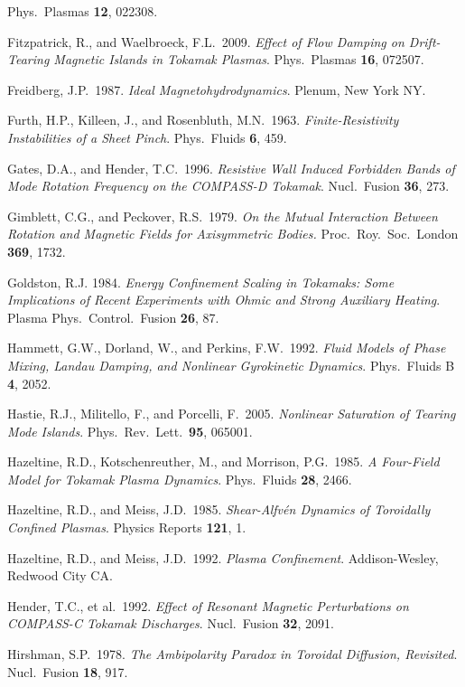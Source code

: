 \documentclass[notitlepage,12pt]{article}
\begin{document}
\begin{description}
Phys.\ Plasmas {\bf 12}, 022308. 
\item Fitzpatrick, R., and Waelbroeck, F.L.\ 2009. {\em Effect of Flow Damping on Drift-Tearing Magnetic Islands in Tokamak Plasmas}.
Phys.\ Plasmas {\bf 16}, 072507.
\item Freidberg, J.P.\ 1987. {\em Ideal Magnetohydrodynamics}. Plenum, New York NY. 
\item Furth, H.P., Killeen, J., and Rosenbluth, M.N.\ 1963. {\em Finite-Resistivity Instabilities of a Sheet Pinch}. Phys.\ Fluids {\bf 6}, 459.
\item Gates, D.A., and Hender, T.C.\ 1996. {\em Resistive Wall Induced Forbidden Bands of Mode Rotation Frequency on the COMPASS-D Tokamak}. Nucl.\ Fusion {\bf 36}, 273. 
\item Gimblett, C.G., and Peckover, R.S.\ 1979. {\em On the Mutual Interaction Between Rotation and Magnetic Fields
for Axisymmetric Bodies.} Proc.\ Roy.\ Soc.\ London {\bf 369}, 1732. 
\item Goldston, R.J. 1984. {\em Energy Confinement Scaling in Tokamaks: Some Implications of Recent Experiments with Ohmic and Strong Auxiliary Heating}. Plasma Phys.\ Control.\ Fusion {\bf 26}, 87. 
\item Hammett, G.W., Dorland, W., and Perkins, F.W.\ 1992.  {\em Fluid Models of Phase Mixing, Landau Damping, and Nonlinear Gyrokinetic Dynamics}. Phys.\ Fluids B {\bf 4}, 2052. 
\item Hastie, R.J., Militello, F., and Porcelli, F.\ 2005. {\em Nonlinear Saturation of Tearing Mode Islands}. Phys.\ Rev.\ Lett.\ {\bf 95}, 065001. 
\item Hazeltine, R.D., Kotschenreuther, M., and Morrison, P.G.\ 1985. {\em A Four-Field Model for Tokamak Plasma Dynamics}.
 Phys.\ Fluids {\bf 28}, 2466.
\item Hazeltine, R.D., and Meiss, J.D.\ 1985. {\em Shear-Alfv\'{e}n Dynamics of Toroidally Confined Plasmas}. Physics Reports {\bf 121}, 1.
\item Hazeltine, R.D., and Meiss, J.D.\ 1992. {\em Plasma Confinement}. Addison-Wesley, Redwood City CA. 
\item Hender, T.C., et al.\ 1992. {\em Effect of Resonant Magnetic Perturbations on COMPASS-C Tokamak Discharges}. Nucl.\ Fusion
{\bf 32}, 2091.  
\item Hirshman, S.P.\ 1978. {\em The Ambipolarity Paradox in Toroidal Diffusion, Revisited}. Nucl.\ Fusion {\bf 18}, 917.

\end{description}
\end{document}
